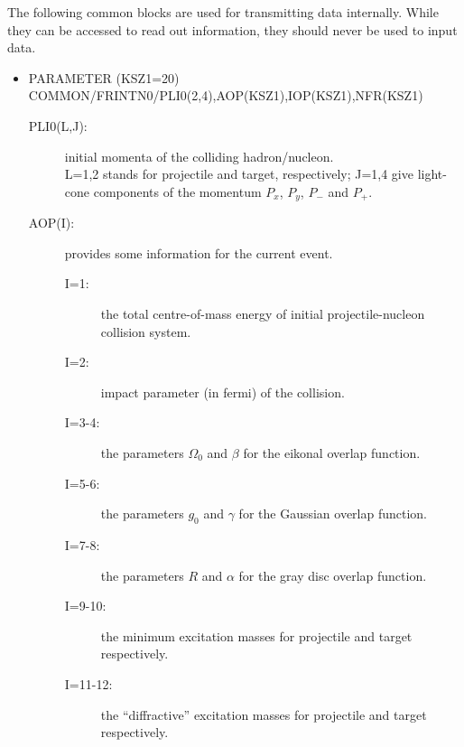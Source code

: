 The following common blocks are used for transmitting data internally.
While they can be accessed to read out information, they should never be
used to input data. 

\begin{itemize}
\item{PARAMETER (KSZ1=20) \\
      COMMON/FRINTN0/PLI0(2,4),AOP(KSZ1),IOP(KSZ1),NFR(KSZ1)}

\begin{description}

\item[PLI0(L,J): ] initial momenta of the colliding hadron/nucleon. \\
          L=1,2 stands for projectile and target, respectively;
          J=1,4 give light-cone components of the momentum $P_x$, $P_y$,
                $P_-$ and $P_+$.
\item[AOP(I): ] provides some information for the current event. 
\begin{description}
  \item[I=1: ] the total centre-of-mass energy of initial 
        projectile-nucleon collision system.
  \item[I=2: ] impact parameter (in fermi) of the collision. 
  \item[I=3-4: ] the parameters $\Omega_0$ and $\beta$ for the eikonal overlap function.
  \item[I=5-6: ] the parameters $g_0$ and $\gamma$ for the Gaussian overlap function.
  \item[I=7-8: ] the parameters $R$ and $\alpha$ for the gray disc overlap function.
  \item[I=9-10: ] the minimum excitation masses for projectile and target
                  respectively.
  \item[I=11-12: ] the ``diffractive'' excitation masses for projectile and 
            target respectively.
\end{description}


\end{description}
\end{itemize}
